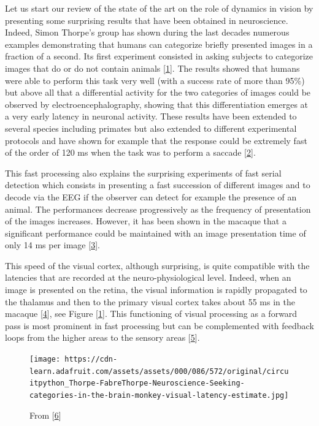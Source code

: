 Let us start our review of the state of the art on the role of dynamics in vision by presenting some surprising results that have been obtained in neuroscience. Indeed, Simon Thorpe's group has shown during the last decades numerous examples demonstrating that humans can categorize briefly presented images in a fraction of a second. Its first experiment consisted in asking subjects to categorize images that do or do not contain animals {[}\protect\hyperlink{ref-G3GlupPg}{1}{]}. The results showed that humans were able to perform this task very well (with a success rate of more than 95\%) but above all that a differential activity for the two categories of images could be observed by electroencephalography, showing that this differentiation emerges at a very early latency in neuronal activity. These results have been extended to several species including primates but also extended to different experimental protocols and have shown for example that the response could be extremely fast of the order of 120 ms when the task was to perform a saccade {[}\protect\hyperlink{ref-B9iZWoq3}{2}{]}.

This fast processing also explains the surprising experiments of fast serial detection which consists in presenting a fast succession of different images and to decode via the EEG if the observer can detect for example the presence of an animal. The performances decrease progressively as the frequency of presentation of the images increases. However, it has been shown in the macaque that a significant performance could be maintained with an image presentation time of only 14 ms per image {[}\protect\hyperlink{ref-EqCCVwl2}{3}{]}.

This speed of the visual cortex, although surprising, is quite compatible with the latencies that are recorded at the neuro-physiological level. Indeed, when an image is presented on the retina, the visual information is rapidly propagated to the thalamus and then to the primary visual cortex takes about 55 ms in the macaque {[}\protect\hyperlink{ref-Vu87UU6A}{4}{]}, see Figure {[}\ref{fig:thorpe}{]}. This functioning of visual processing as a forward pass is most prominent in fast processing but can be complemented with feedback loops from the higher areas to the sensory areas {[}\protect\hyperlink{ref-15aMjRHVK}{5}{]}.

\begin{figure}
\hypertarget{fig:thorpe}{%
\centering
\texttt{[image: https://cdn-learn.adafruit.com/assets/assets/000/086/572/original/circuitpython\_Thorpe-FabreThorpe-Neuroscience-Seeking-categories-in-the-brain-monkey-visual-latency-estimate.jpg]}
\caption{From {[}\protect\hyperlink{ref-12dWDpY61}{6}{]}}\label{fig:thorpe}
}
\end{figure}

